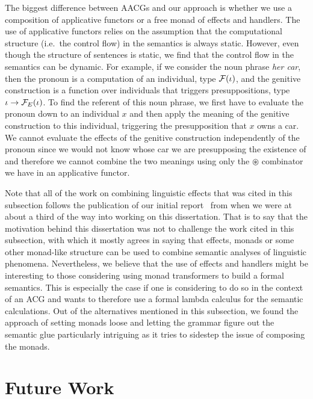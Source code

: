 \begin{itemize}
  The biggest difference between AACGs and our approach is whether we use a
  composition of applicative functors or a free monad of effects and
  handlers. The use of applicative functors relies on the assumption that
  the computational structure (i.e.\ the control flow) in the semantics is
  always static. However, even though the structure of sentences is static,
  we find that the control flow in the semantics can be dynamic. For
  example, if we consider the noun phrase \emph{her car}, then the pronoun
  is a computation of an individual, type $\mathcal{F}(\iota)$, and the genitive
  construction is a function over individuals that triggers
  presuppositions, type $\iota \to \mathcal{F}_E(\iota)$. To find the referent of
  this noun phrase, we first have to evaluate the pronoun down to an
  individual $x$ and then apply the meaning of the genitive construction to
  this individual, triggering the presupposition that $x$ owns a car. We
  cannot evaluate the effects of the genitive construction independently of
  the pronoun since we would not know whose car we are presupposing the
  existence of and therefore we cannot combine the two meanings using only
  the $\circledast$ combinator we have in an applicative functor.

\end{itemize}

Note that all of the work on combining linguistic effects that was cited in
this subsection follows the publication of our initial
report~\cite{marsik2014algebraic} from when we were at about a third of the
way into working on this dissertation. That is to say that the motivation
behind this dissertation was not to challenge the work cited in this
subsection, with which it mostly agrees in saying that effects, monads or
some other monad-like structure can be used to combine semantic analyses of
linguistic phenomena. Nevertheless, we believe that the use of effects and
handlers might be interesting to those considering using monad transformers
to build a formal semantics. This is especially the case if one is
considering to do so in the context of an ACG and wants to therefore use a
formal lambda calculus for the semantic calculations. Out of the
alternatives mentioned in this subsection, we found the approach of setting
monads loose and letting the grammar figure out the semantic glue
particularly intriguing as it tries to sidestep the issue of composing the
monads.


\section{Future Work}
\label{sec:future-work}
